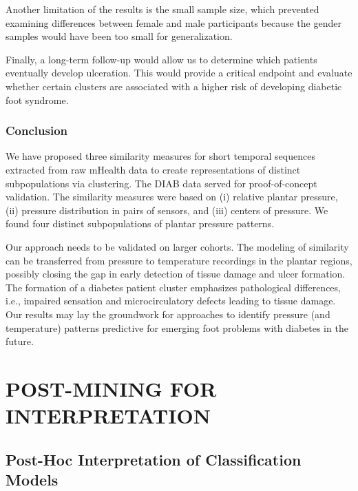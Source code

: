 \documentclass[
  oneside]{book}
\begin{document}
Another limitation of the results is the small sample size, which prevented examining differences between female and male participants because the gender samples would have been too small for generalization.

Finally, a long-term follow-up would allow us to determine which patients eventually develop ulceration.
This would provide a critical endpoint and evaluate whether certain clusters are associated with a higher risk of developing diabetic foot syndrome.

\hypertarget{diabfoot-conclusion}{%
\section{Conclusion}\label{diabfoot-conclusion}}

We have proposed three similarity measures for short temporal sequences extracted from raw mHealth data to create representations of distinct subpopulations via clustering.
The DIAB data served for proof-of-concept validation.
The similarity measures were based on (i) relative plantar pressure, (ii) pressure distribution in pairs of sensors, and (iii) centers of pressure.
We found four distinct subpopulations of plantar pressure patterns.

Our approach needs to be validated on larger cohorts.
The modeling of similarity can be transferred from pressure to temperature recordings in the plantar regions, possibly closing the gap in early detection of tissue damage and ulcer formation.
The formation of a diabetes patient cluster emphasizes pathological differences, i.e., impaired sensation and microcirculatory defects leading to tissue damage.
Our results may lay the groundwork for approaches to identify pressure (and temperature) patterns predictive for emerging foot problems with diabetes in the future.





\hypertarget{part-post-mining-for-interpretation}{%
\part{POST-MINING FOR INTERPRETATION}\label{part-post-mining-for-interpretation}}

\hypertarget{iml}{%
\chapter{Post-Hoc Interpretation of Classification Models}\label{iml}}
\end{document}
